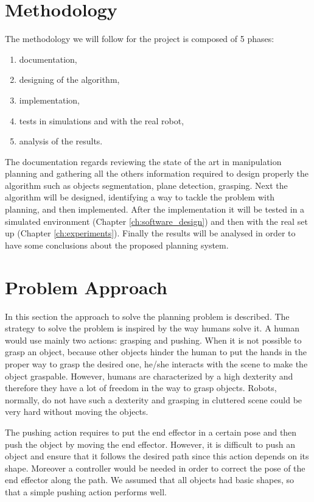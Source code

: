 \section{Methodology}
The methodology we will follow for the project is composed of 5 phases:
\begin{enumerate}
\item documentation,
\item designing of the algorithm,
\item implementation,
\item tests in simulations and with the real robot,
\item analysis of the results. 
\end{enumerate}
The documentation regards reviewing the state of the art in manipulation planning and gathering all the others information required to design properly the algorithm such as objects segmentation, plane detection, grasping. Next the algorithm will be designed, identifying a way to tackle the problem with planning, and then implemented. After the implementation it will be tested in a simulated environment (Chapter \ref{ch:software_design}) and then 
with the real set up (Chapter \ref{ch:experiments}). Finally the results will be analysed in order to have some conclusions about the proposed planning system. 

\section{Problem Approach}
In this section the approach to solve the planning problem is described. The strategy to solve the problem is inspired by the way humans solve it. A human would use mainly two actions: grasping and pushing. When it is not possible to grasp an object, because other objects hinder the human to put the hands in the proper way to grasp the desired one, he/she interacts with the scene to make the object graspable. However,  humans are characterized by a high dexterity and therefore they have a lot of freedom in the way to grasp objects. Robots, normally, do not have such a dexterity and grasping in cluttered scene could be very hard without moving the objects. 

The pushing action requires to put the end effector in a certain pose and then push the object by moving the end effector. However, it is difficult to push an object and ensure that it follows the desired path since this action depends on its shape. Moreover a controller would be needed in order to correct the pose of the end effector along the path. We assumed that all objects had basic shapes, so that a simple pushing action performs well.

